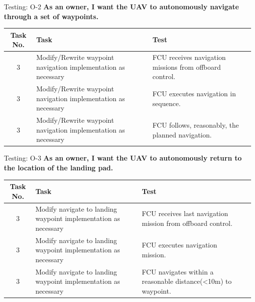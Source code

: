 \documentclass[11pt]{beamer}
\begin{document}
\begin{frame}{Testing: O-2}
\textbf{As an owner, I want the UAV to autonomously navigate through a set of waypoints.}
\begin{tabular}{| c | >{\raggedright}m{4cm} | m{4cm} | c |}\hline
	Task No. & Task & Test\\\hline
	3 & Modify/Rewrite waypoint navigation implementation as necessary & FCU receives navigation missions from offboard control.\\\hline
	3 & Modify/Rewrite waypoint navigation implementation as necessary & FCU executes navigation in sequence.\\\hline
	3 & Modify/Rewrite waypoint navigation implementation as necessary & FCU follows, reasonably, the planned navigation.\\\hline
\end{tabular}
\end{frame}
\begin{frame}{Testing: O-3}
\textbf{As an owner, I want the UAV to autonomously return to the location of the landing pad.}
\begin{tabular}{| c | >{\raggedright}m{4cm} | m{4cm} | c |}\hline
	Task No. & Task & Test\\\hline
	3 & Modify navigate to landing waypoint implementation as necessary & FCU receives last navigation mission from offboard control.\\\hline
	3 & Modify navigate to landing waypoint implementation as necessary & FCU executes navigation mission.\\\hline
	3 & Modify navigate to landing waypoint implementation as necessary & FCU navigates within a reasonable distance(\textless 10m) to waypoint.\\\hline
\end{tabular}
\end{frame}
\end{document}
